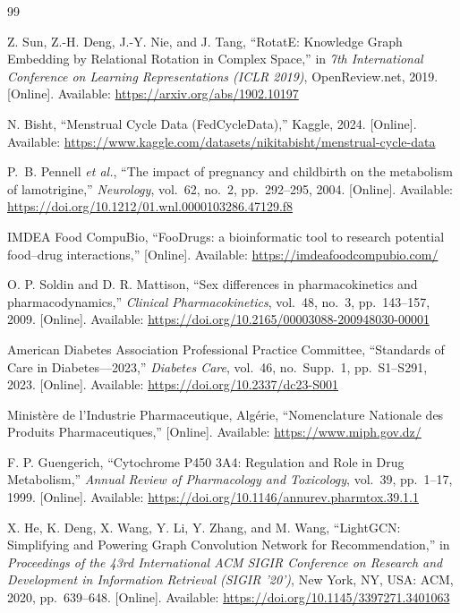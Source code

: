 \begin{thebibliography}{99}

Z. Sun, Z.-H. Deng, J.-Y. Nie, and J. Tang,
``RotatE: Knowledge Graph Embedding by Relational Rotation in Complex Space,''
in \textit{7th International Conference on Learning Representations (ICLR 2019)},
OpenReview.net, 2019.
[Online]. Available: \url{https://arxiv.org/abs/1902.10197}

N. Bisht,
``Menstrual Cycle Data (FedCycleData),''
Kaggle, 2024.
[Online]. Available: \url{https://www.kaggle.com/datasets/nikitabisht/menstrual-cycle-data}

P.~B. Pennell \textit{et al.},
``The impact of pregnancy and childbirth on the metabolism of lamotrigine,''
\textit{Neurology}, vol.~62, no.~2, pp.~292--295, 2004.
[Online]. Available: \url{https://doi.org/10.1212/01.wnl.0000103286.47129.f8}

IMDEA Food CompuBio,
``FooDrugs: a bioinformatic tool to research potential food--drug interactions,''
[Online]. Available: \url{https://imdeafoodcompubio.com/}

O. P. Soldin and D. R. Mattison,
``Sex differences in pharmacokinetics and pharmacodynamics,''
\textit{Clinical Pharmacokinetics}, vol.~48, no.~3, pp.~143--157, 2009.
[Online]. Available: \url{https://doi.org/10.2165/00003088-200948030-00001}

American Diabetes Association Professional Practice Committee,
``Standards of Care in Diabetes---2023,''
\textit{Diabetes Care}, vol.~46, no.~Supp.~1, pp.~S1--S291, 2023.
[Online]. Available: \url{https://doi.org/10.2337/dc23-S001}

Ministère de l'Industrie Pharmaceutique, Algérie,
``Nomenclature Nationale des Produits Pharmaceutiques,''
[Online]. Available: \url{https://www.miph.gov.dz/}

F. P. Guengerich,
``Cytochrome P450 3A4: Regulation and Role in Drug Metabolism,''
\textit{Annual Review of Pharmacology and Toxicology}, vol.~39, pp.~1--17, 1999.
[Online]. Available: \url{https://doi.org/10.1146/annurev.pharmtox.39.1.1}

X. He, K. Deng, X. Wang, Y. Li, Y. Zhang, and M. Wang,
``LightGCN: Simplifying and Powering Graph Convolution Network for Recommendation,''
in \textit{Proceedings of the 43rd International ACM SIGIR Conference on Research and Development in Information Retrieval (SIGIR '20')},
New York, NY, USA: ACM, 2020, pp.~639--648.
[Online]. Available: \url{https://doi.org/10.1145/3397271.3401063}


\end{thebibliography}
